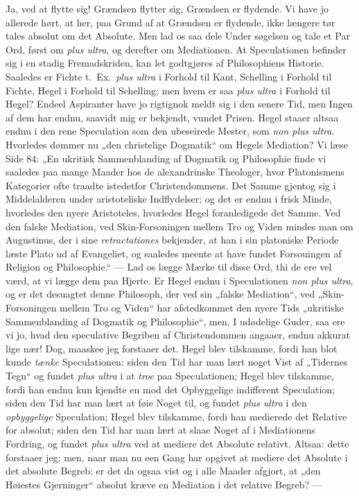 Ja, ved at flytte sig! Grændsen flytter sig, Grændsen er flydende.
Vi have jo allerede hørt, at her, paa Grund af at Grændsen er
flydende, ikke længere tør tales absolut om det Absolute. Men lad
os saa dele Under%
søgelsen og tale et Par Ord, først om \textit{plus ultra}, og
derefter om Mediationen. At Speculationen befinder sig i en stadig
Fremadskriden, kan let godtgjøres af Philosophiens Historie.
Saaledes er Fichte t.\ Ex.\ \textit{plus ultra} i Forhold til
Kant, Schelling i Forhold til Fichte, Hegel i Forhold til
Schelling; men hvem er saa \textit{plus ultra} i Forhold til
Hegel? Endeel Aspiranter have jo rigtignok meldt sig i den senere
Tid, men Ingen af dem har endnu, saavidt mig er bekjendt, vundet
Prisen. Hegel staaer altsaa endnu i den rene Speculation som den
ubeseirede Mester, som \textit{non plus ultra}. Hvorledes dømmer
nu „den christelige Dogmatik“ om Hegels Mediation? Vi læse Side
84: „En ukritisk Sammenblanding af Dogmatik og Philosophie finde
vi saaledes paa mange Maader hos de alexandrinske Theologer, hvor
Platonismens Kategorier ofte traadte istedetfor Christendommens.
Det Samme gjentog sig i Middelalderen under aristoteliske
Indflydelser; og det er endnu i frisk Minde, hvorledes den nyere
Aristoteles, hvorledes Hegel foranledigede det Samme. Ved den
falske Mediation, ved Skin-Forsoningen mellem Tro og Viden mindes
man om Augustinus, der i sine \textit{retractationes} bekjender,
at han i sin platoniske Periode læste Plato ud af Evangeliet, og
saaledes meente at have fundet Forsouingen af Religion og
Philosophie.“ --- Lad os lægge Mærke til disse Ord, thi de ere vel
værd, at vi lægge dem paa Hjerte. Er Hegel endnu i Speculationen
\textit{non plus ultra}, og er det desuagtet denne Philosoph, der
ved sin
 „falske Mediation“, ved „Skin-Forsoningen mellem Tro og Viden“ har
afstedkommet den nyere Tids „ukritiske Sammenblanding af Dogmatik
og Philosophie“, men, I udødelige Guder, saa ere vi jo, hvad den
speculative Begriben af Christendommen angaaer, endnu akkurat lige
nær! Dog, maaskee jeg forstaaer det. Hegel blev tilskamme, fordi
han blot kunde \emph{tænke} Speculationen: siden den Tid har man
lært noget Vist af „Tidernes Tegn“ og fundet \textit{plus ultra} i
at \emph{troe} paa Speculationen; Hegel blev tilskamme, fordi han
endnu kun kjendte en mod det Opbyggelige indifferent Speculation;
siden den Tid har man lært at føie Noget til, og fundet
\textit{plus ultra} i den \emph{opbyggelige} Speculation; Hegel
blev tilskamme, fordi han medierede det Relative for absolut;
siden den Tid har man lært at slaae Noget af i Mediationens
Fordring, og fundet \textit{plus ultra} ved at mediere det
Absolute relativt. Altsaa: dette forstaaer jeg; men, naar man nu
een Gang har opgivet at mediere det Absolute i det absolute
Begreb: er det da ogsaa vist og i alle Maader afgjort, at „den
Høiestes Gjerninger“ absolut kræve en Mediation i det relative
Begreb? ---

